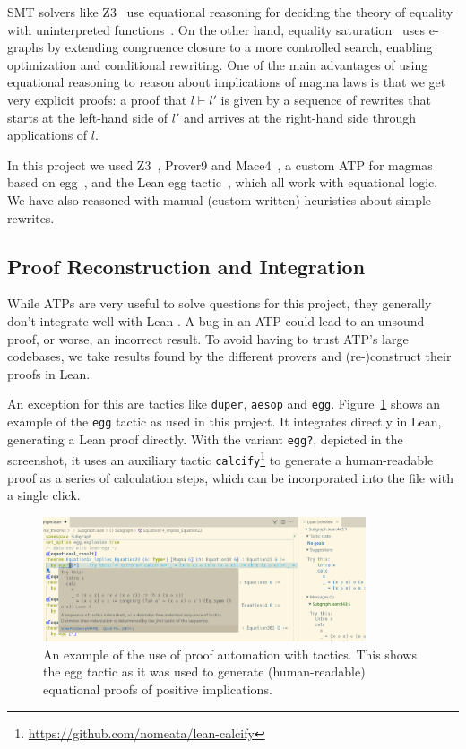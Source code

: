 SMT solvers like Z3~\cite{DBLP:conf/tacas/MouraB08} use equational reasoning for deciding the theory of equality with uninterpreted functions~\cite{DBLP:series/txtcs/KroeningS16,DBLP:conf/cade/MouraB07}.
On the other hand, equality saturation~\cite{DBLP:journals/pacmpl/WillseyNWFTP21} uses e-graphs by extending congruence closure to a more controlled search, enabling optimization and conditional rewriting.
One of the main advantages of using equational reasoning to reason about implications of magma laws is that we get very explicit proofs: a proof that $l \vdash l'$ is given by a sequence of rewrites that starts at the left-hand side of $l'$ and arrives at the right-hand side through applications of $l$.

In this project we used Z3~\cite{DBLP:conf/tacas/MouraB08}, Prover9 and Mace4~\cite{prover9-mace4}, a custom ATP for magmas based on egg~\cite{DBLP:journals/pacmpl/WillseyNWFTP21}, and the Lean egg tactic~\cite{DBLP:journals/pacmpl/KoehlerGBGTS24,rossel2024bridging}, which all work with equational logic. We have also reasoned with manual (custom written) heuristics about simple rewrites.

\subsection{Proof Reconstruction and Integration}
\label{sec:proof-reconstruction}

While ATPs are very useful to solve questions for this project, they generally don't integrate well with Lean .
A bug in an ATP could lead to an unsound proof, or worse, an incorrect result.
To avoid having to trust ATP's large codebases, we take results found by the different provers and (re-)construct their proofs in Lean.

An exception for this are tactics like \texttt{duper}, \texttt{aesop} and \texttt{egg}. Figure~\ref{fig:screenshot-egg} shows an example of the \texttt{egg} tactic as used in this project. It integrates directly in Lean, generating a Lean proof directly. With the variant \texttt{egg?}, depicted in the screenshot, it uses an auxiliary tactic \texttt{calcify}\footnote{\url{https://github.com/nomeata/lean-calcify}} to generate a human-readable proof as a series of calculation steps, which can be incorporated into the file with a single click.

\begin{figure}
  \centering
  \includegraphics[width=0.85\textwidth]{screenshot-egg.png}
  \caption{An example of the use of proof automation with tactics. This shows the egg tactic as it was used to generate (human-readable) equational proofs of positive implications.}
  \label{fig:screenshot-egg}
\end{figure}

